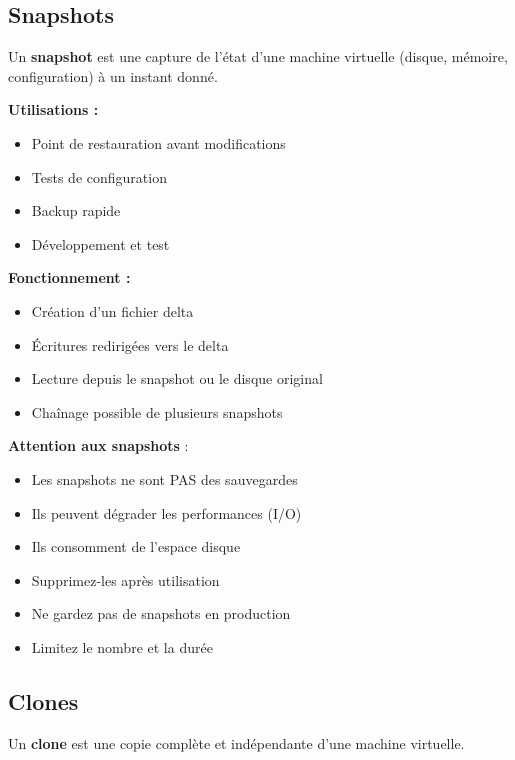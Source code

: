 \documentclass[11pt,a4paper]{article}
\begin{document}
\subsection{Snapshots}

\begin{definitionbox}
Un \textbf{snapshot} est une capture de l'état d'une machine virtuelle (disque, mémoire, configuration) à un instant donné.
\end{definitionbox}

\textbf{Utilisations :}
\begin{itemize}
    \item Point de restauration avant modifications
    \item Tests de configuration
    \item Backup rapide
    \item Développement et test
\end{itemize}

\textbf{Fonctionnement :}
\begin{itemize}
    \item Création d'un fichier delta
    \item Écritures redirigées vers le delta
    \item Lecture depuis le snapshot ou le disque original
    \item Chaînage possible de plusieurs snapshots
\end{itemize}

\begin{importantbox}
\textbf{Attention aux snapshots} : 
\begin{itemize}
    \item Les snapshots ne sont PAS des sauvegardes
    \item Ils peuvent dégrader les performances (I/O)
    \item Ils consomment de l'espace disque
    \item Supprimez-les après utilisation
    \item Ne gardez pas de snapshots en production
    \item Limitez le nombre et la durée
\end{itemize}
\end{importantbox}

\subsection{Clones}

\begin{definitionbox}
Un \textbf{clone} est une copie complète et indépendante d'une machine virtuelle.
\end{definitionbox}
\end{document}

